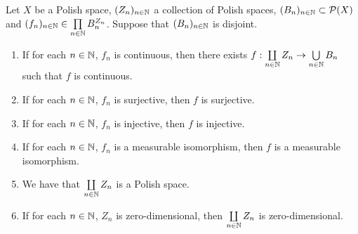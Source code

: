 \documentclass{book}
\begin{document}
	\begin{ex} 
		Let $X$ be a Polish space, $(Z_n)_{n \in \mathbb{N}}$ a collection of Polish spaces, $(B_n)_{n \in \mathbb{N}} \subset \mathcal{P}(X)$ and $(f_n)_{n \in \mathbb{N}} \in \prod\limits_{n \in \mathbb{N}} B_n^{Z_n}$. Suppose that $(B_n)_{n \in \mathbb{N}}$ is disjoint. 
		\begin{enumerate}
			\item If for each $n \in \mathbb{N}$, $f_n$ is continuous, then there exists $f: \coprod\limits_{n \in \mathbb{N}} Z_n \rightarrow \bigcup\limits_{n \in \mathbb{N}} B_n$ such that $f$ is continuous. 
			\item If for each $n \in \mathbb{N}$, $f_n$ is surjective, then $f$ is surjective.
			\item If for each $n \in \mathbb{N}$, $f_n$ is injective, then $f$ is injective.
			\item If for each $n \in \mathbb{N}$, $f_n$ is a measurable isomorphism, then $f$ is a measurable isomorphism.
			\item We have that $\coprod\limits_{n \in \mathbb{N}} Z_n$ is a Polish space.
			\item If for each $n \in \mathbb{N}$, $Z_n$ is zero-dimensional, then $\coprod\limits_{n \in \mathbb{N}} Z_n$ is zero-dimensional.
		\end{enumerate}
	\end{ex}
\end{document}
